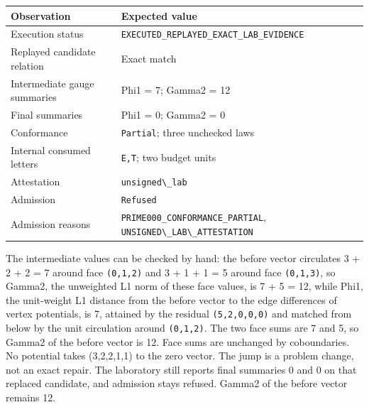 \documentclass[
  11pt,
]{article}
\newcommand{\passthrough}[1]{#1}
\begin{document}
\begin{longtable}[]{@{}
  >{\raggedright\arraybackslash}p{}
  >{\raggedright\arraybackslash}p{}@{}}
\toprule\noalign{}
\begin{minipage}[b]{\linewidth}\raggedright
Observation
\end{minipage} & \begin{minipage}[b]{\linewidth}\raggedright
Expected value
\end{minipage} \\
\midrule\noalign{}
\endhead
\bottomrule\noalign{}
\endlastfoot
Execution status & \nolinkurl{EXECUTED_REPLAYED_EXACT_LAB_EVIDENCE} \\
Replayed candidate relation & Exact match \\
Intermediate gauge summaries & Phi1 = 7; Gamma2 = 12 \\
Final summaries & Phi1 = 0; Gamma2 = 0 \\
Conformance & \passthrough{\lstinline!Partial!}; three unchecked laws \\
Internal consumed letters & \passthrough{\lstinline!E,T!}; two budget
units \\
Attestation & \passthrough{\lstinline!unsigned\_lab!} \\
Admission & \passthrough{\lstinline!Refused!} \\
Admission reasons & \nolinkurl{PRIME000_CONFORMANCE_PARTIAL},
\passthrough{\lstinline!UNSIGNED\_LAB\_ATTESTATION!} \\
\end{longtable}

The intermediate values can be checked by hand: the before vector
circulates 3 + 2 + 2 = 7 around face \passthrough{\lstinline!(0,1,2)!}
and 3 + 1 + 1 = 5 around face \passthrough{\lstinline!(0,1,3)!}, so
Gamma2, the unweighted L1 norm of these face values, is 7 + 5 = 12,
while Phi1, the unit-weight L1 distance from the before vector to the
edge differences of vertex potentials, is 7, attained by the residual
\passthrough{\lstinline!(5,2,0,0,0)!} and matched from below by the unit
circulation around \passthrough{\lstinline!(0,1,2)!}. The two face sums are 7 and 5, so Gamma2 of the before vector is 12.
Face sums are unchanged by coboundaries. No potential takes
(3,2,2,1,1) to the zero vector. The jump is a problem change, not an
exact repair. The laboratory still reports final summaries 0 and 0 on
that replaced candidate, and admission stays refused. Gamma2 of the
before vector remains 12.
\end{document}
